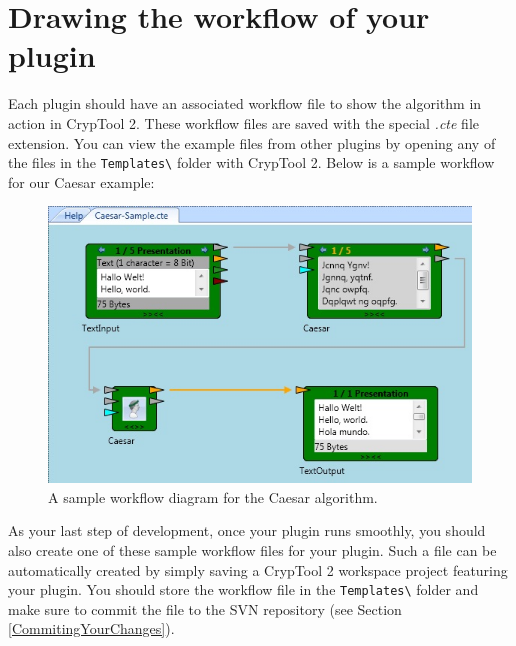 \section{Drawing the workflow of your plugin}
\label{DrawingTheWorkfloweOfYourPlugin}

Each plugin should have an associated workflow file to show the algorithm in action in CrypTool 2. These workflow files are saved with the special \textit{.cte} file extension. You can view the example files from other plugins by opening any of the files in the \texttt{Templates\textbackslash} folder with CrypTool 2. Below is a sample workflow for our Caesar example:

\begin{figure}[h]
	\centering
		\includegraphics{figures/sample.jpg}
	\caption{A sample workflow diagram for the Caesar algorithm.}
	\label{fig:sample}
\end{figure}

As your last step of development, once your plugin runs smoothly, you should also create one of these sample workflow files for your plugin. Such a file can be automatically created by simply saving a CrypTool 2 workspace project featuring your plugin. You should store the workflow file in the \texttt{Templates\textbackslash} folder and make sure to commit the file to the SVN repository (see Section \ref{CommitingYourChanges}).
